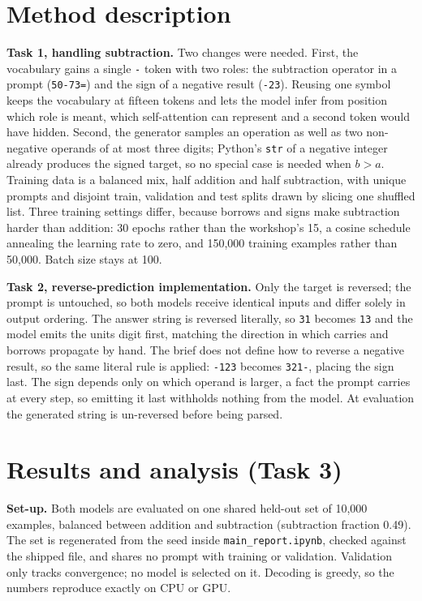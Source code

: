 \documentclass[10pt,a4paper,twocolumn]{article}
\begin{document}
\section{Method description}
\textbf{Task 1, handling subtraction.}
Two changes were needed. First, the vocabulary gains a single \texttt{-} token with two roles: the
subtraction operator in a prompt (\texttt{50-73=}) and the sign of a negative result
(\texttt{-23}). Reusing one symbol keeps the vocabulary at fifteen tokens and lets the model infer
from position which role is meant, which self-attention can represent and a second token
would have hidden. Second, the generator samples an operation as well as two non-negative
operands of at most three digits; Python's \texttt{str} of a negative integer already produces the
signed target, so no special case is needed when $b > a$. Training data is a balanced mix, half
addition and half subtraction, with unique prompts and disjoint train, validation and test splits
drawn by slicing one shuffled list. Three training settings differ, because borrows and signs make subtraction harder than
addition: 30 epochs rather than the workshop's 15, a cosine schedule annealing the
learning rate to zero, and 150,000 training examples rather than 50,000.
Batch size stays at 100.

\textbf{Task 2, reverse-prediction implementation.}
Only the target is reversed; the prompt is untouched, so both models receive identical inputs and
differ solely in output ordering. The answer string is reversed literally, so \texttt{31} becomes
\texttt{13} and the model emits the units digit first, matching the direction in which carries and
borrows propagate by hand. The brief does not define how to reverse a negative result, so the same
literal rule is applied: \texttt{-123} becomes \texttt{321-}, placing the sign last. The sign
depends only on which operand is larger, a fact the prompt carries at every step, so emitting it
last withholds nothing from the model. At evaluation the generated string is un-reversed before
being parsed.

\section{Results and analysis (Task 3)}
\textbf{Set-up.} Both models are evaluated on one shared held-out set of 10,000 examples,
balanced between addition and subtraction (subtraction fraction 0.49). The set is
regenerated from the seed inside \texttt{main\_report.ipynb}, checked against the shipped file,
and shares no prompt with training or validation. Validation only tracks convergence;
no model is selected on it. Decoding is greedy, so the numbers
reproduce exactly on CPU or GPU.
\end{document}
